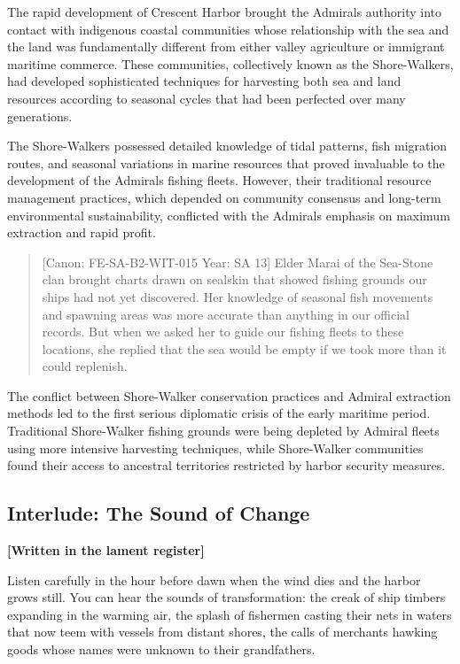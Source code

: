The rapid development of Crescent Harbor brought the
Admiral\textquotesingle s authority into contact with indigenous coastal
communities whose relationship with the sea and the land was
fundamentally different from either valley agriculture or immigrant
maritime commerce. These communities, collectively known as the
Shore-Walkers, had developed sophisticated techniques for harvesting
both sea and land resources according to seasonal cycles that had been
perfected over many generations.

The Shore-Walkers possessed detailed knowledge of tidal patterns, fish
migration routes, and seasonal variations in marine resources that
proved invaluable to the development of the Admiral\textquotesingle s
fishing fleets. However, their traditional resource management
practices, which depended on community consensus and long-term
environmental sustainability, conflicted with the
Admiral\textquotesingle s emphasis on maximum extraction and rapid
profit.

\begin{quote}
{[}Canon: FE-SA-B2-WIT-015 \textbar{} Year: SA 13{]} Elder Marai of the
Sea-Stone clan brought charts drawn on sealskin that showed fishing
grounds our ships had not yet discovered. Her knowledge of seasonal fish
movements and spawning areas was more accurate than anything in our
official records. But when we asked her to guide our fishing fleets to
these locations, she replied that the sea would be empty if we took more
than it could replenish.
\end{quote}

The conflict between Shore-Walker conservation practices and Admiral
extraction methods led to the first serious diplomatic crisis of the
early maritime period. Traditional Shore-Walker fishing grounds were
being depleted by Admiral fleets using more intensive harvesting
techniques, while Shore-Walker communities found their access to
ancestral territories restricted by harbor security measures.

\subsection{Interlude: The Sound of
Change}\label{interlude-the-sound-of-change}

\textbf{{[}Written in the lament register{]}}

Listen carefully in the hour before dawn when the wind dies and the
harbor grows still. You can hear the sounds of transformation: the creak
of ship timbers expanding in the warming air, the splash of fishermen
casting their nets in waters that now teem with vessels from distant
shores, the calls of merchants hawking goods whose names were unknown to
their grandfathers.

